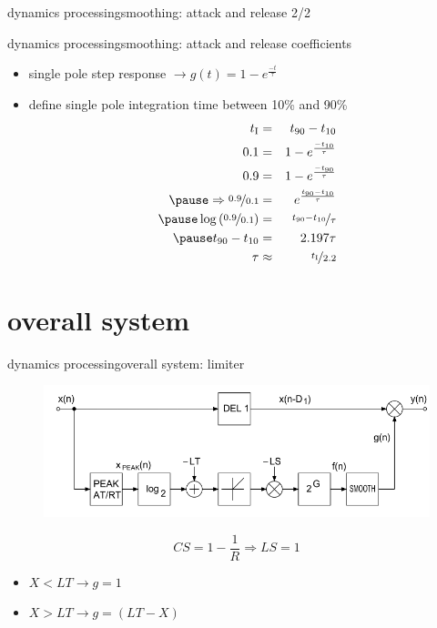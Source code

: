 \begin{frame}{dynamics processing}{smoothing: attack and release 2/2}
\end{frame}

\begin{frame}{dynamics processing}{smoothing: attack and release coefficients}
    \begin{itemize}
        \item   single pole step response $\rightarrow g(t) = 1-e^{\frac{-t}{\tau}}$ 
        \pause
        \item   define single pole integration time between 10\% and 90\%
            \begin{eqnarray*}
                t_\mathrm{I} &=& t_{90} - t_{10}\\
                0.1 &=& 1 - e^{\frac{-t_{10}}{\tau}}\\
                0.9 &=& 1 - e^{\frac{-t_{90}}{\tau}}\\
        \pause
            \Rightarrow \nicefrac{0.9}{0.1} &=& e^{\frac{t_{90}-t_{10}}{\tau}}\\
        \pause
            \log\left(\nicefrac{0.9}{0.1}\right) &=& \nicefrac{t_{90}-t_{10}}{\tau}\\
        \pause
            t_{90}-t_{10} &=& 2.197\tau\\
            \tau &\approx& \nicefrac{t_\mathrm{I}}{2.2}
        \end{eqnarray*}

    \end{itemize}
\end{frame}

\section{overall system}
\begin{frame}{dynamics processing}{overall system: limiter}
	\begin{figure}
		\centering
			\includegraphics[scale=.5]{graph/limiter}
	\end{figure}
	\begin{equation*}
		CS = 1-\frac{1}{R} \Rightarrow LS = 1
	\end{equation*}

	\pause	
	\begin{itemize}
		\item	$X<LT\rightarrow g = 1$
		\pause
		\item	$X>LT\rightarrow g = (LT-X)$
	\end{itemize}
\end{frame}

